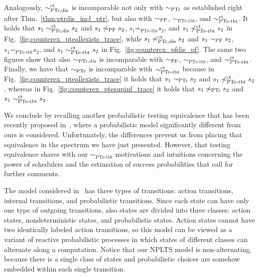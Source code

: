 \documentclass{LMCS}
\newcommand{\sbis}[1]
	{\sim_{#1}}
\begin{document}
Analogously, $\sbis{\rm PTr,dis}^{\rm ct}$ is incomparable not only with $\sbis{\rm PTr}$ as established
right after Thm.~\ref{thm:ptrdis_incl_ptr}, but also with $\sbis{\rm PF}$, $\sbis{\textrm{PTe-tbt}}$, and
$\sbis{\textrm{PTe-tbt}}^{\rm ct}$. It holds that $s_{1} \sbis{\rm PTr,dis}^{\rm ct} s_{2}$ and $s_{1}
\not\sbis{\rm PF} s_{2}$, $s_{1} \not\sbis{\textrm{PTe-tbt}} s_{2}$, and $s_{1}
\not\sbis{\textrm{PTe-tbt}}^{\rm ct} s_{2}$ in Fig.~\ref{fig:counterex_pteallexists_trace}, while $s_{1}
\not\sbis{\rm PTr,dis}^{\rm ct} s_{2}$ and $s_{1} \sbis{\rm PF} s_{2}$, $s_{1} \sbis{\textrm{PTe-tbt}}
s_{2}$, and $s_{1} \sbis{\textrm{PTe-tbt}}^{\rm ct} s_{2}$ in Fig.~\ref{fig:counterex_pfdis_pf}. The same
two figures show that also $\sbis{\rm PTr,dis}$ is incomparable with $\sbis{\rm PF}$,
$\sbis{\textrm{PTe-tbt}}$, and $\sbis{\textrm{PTe-tbt}}^{\rm ct}$. Finally, we have that $\sbis{\rm PTr}$ is
incomparable with $\sbis{\textrm{PTe-tbt}}^{\rm ct}$ because in Fig.~\ref{fig:counterex_pteallexists_trace}
it holds that $s_{1} \sbis{\rm PTr} s_{2}$ and $s_{1} \not\sbis{\textrm{PTe-tbt}}^{\rm ct} s_{2}$, whereas
in Fig.~\ref{fig:counterex_ptesupinf_trace} it holds that $s_{1} \not\sbis{\rm PTr} s_{2}$ and $s_{1}
\sbis{\textrm{PTe-tbt}}^{\rm ct} s_{2}$.

We conclude by recalling another probabilistic testing equivalence that has been recently proposed
in~\cite{GA12}, where a probabilistic model significantly different from ours is considered. Unfortunately,
the differences prevent us from placing that equivalence in the spectrum we have just presented. However,
that testing equivalence shares with our $\sbis{\textrm{PTe-tbt}}$ motivations and intuitions concerning the
power of schedulers and the estimation of success probabilities that call for further comments.

The model considered in~\cite{GA12} has three types of transitions: action transitions, internal
transitions, and probabilistic transitions. Since each state can have only one type of outgoing transitions,
also states are divided into three classes: action states, nondeterministic states, and probabilistic
states. Action states cannot have two identically labeled action transitions, so this model can be viewed as
a variant of reactive probabilistic processes in which states of different classes can alternate along a
computation. Notice that our NPLTS model is non-alternating, because there is a single class of states and
probabilistic choices are somehow embedded within each single transition.
\end{document}
